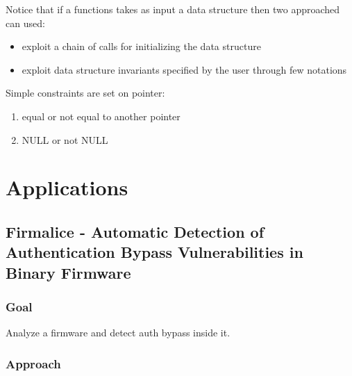 \documentclass[10pt, a4paper]{article}
\begin{document}
Notice that if a functions takes as input a data structure then two approached can used:
\begin{itemize}
  \item exploit a chain of calls for initializing the data structure
  \item exploit data structure invariants specified by the user through few notations
\end{itemize}

Simple constraints are set on pointer:
\begin{enumerate}
  \item equal or not equal to another pointer
  \item NULL or not NULL
\end{enumerate}

\section{Applications}

\subsection{\cite{FIRMALICE-NDSS15} Firmalice - Automatic Detection of Authentication Bypass Vulnerabilities in Binary Firmware} 

\subsubsection{Goal}
Analyze a firmware and detect auth bypass inside it.

\subsubsection{Approach}
\end{document}

